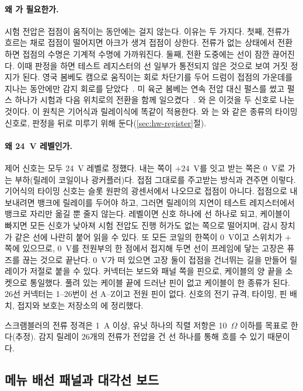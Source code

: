 \paragraph{왜 가 필요한가.} 시험 전압은 접점이 움직이는 동안에는 걸지 않는다. 이유는 두 가지다.
첫째, 전류가 흐르는 채로 접점이 떨어지면 아크가 생겨 접점이 상한다. 전류가 없는 상태에서 전환하면 접점의
수명은 기계적 수명에 가까워진다. 둘째, 전환 도중에는 선이 잠깐 끊어진다. 이때 판정을 하면 테스트 레지스터의
선 일부가 통전되지 않은 것으로 보여 거짓 정지가 된다. 영국 봄베도 캠으로 움직이는 회로 차단기를 두어 드럼이
접점의 가운데를 지나는 동안에만 감지 회로를 닫았다~\cite{us6812report1944}. 미 육군 봄베는 연속 전압 대신
펄스를 썼고 펄스 하나가 시험과 다음 위치로의 전환을 함께 일으켰다~\cite{dturing2021army}. 와
은 이것을 두 신호로 나눈 것이다. 이 원칙은 기어식과 릴레이식에 똑같이 적용한다.
와 는 와 같은 종류의 타이밍 신호로, 판정을  뒤로 미루기 위해
둔다(\ref{sec:hw-register}절).

\paragraph{왜 24~V 레벨인가.} 제어 신호는 모두 24~V 레벨로 정했다. 내는 쪽이 $+24$~V를 잇고 받는 쪽은 0~V로 가는
부하(릴레이 코일이나 광커플러)다. 접점 그대로를 주고받는 방식과 견주면 이렇다. 기어식의 타이밍 신호는 슬롯
원판의 광센서에서 나오므로 접점이 아니다. 접점으로 내보내려면 뱅크에 릴레이를 두어야 하고, 그러면 릴레이의
지연이 테스트 레지스터에서 뱅크로 자리만 옮길 뿐 줄지 않는다. 레벨이면 신호 하나에 선 하나로 되고, 케이블이
빠지면 모든 신호가 낮아져 시험 전압도 진행 허가도 없는 쪽으로 떨어지며, 감시 장치가 같은 선에 나란히 붙어 읽을
수 있다. 또 모든 코일의 한쪽이 0~V이고 스위치가 $+$ 쪽에 있으므로, 0~V를 전원부의 한 점에서 접지해 두면 선이
프레임에 닿는 고장은 퓨즈를 끊는 것으로 끝난다. 0~V가 떠 있으면 고장 둘이 접점을 건너뛰는 길을 만들어 릴레이가
저절로 붙을 수 있다. 커넥터는 보드와 패널 쪽을 핀으로, 케이블의 양 끝을 소켓으로 통일했다. 풀려 있는 케이블
끝에 드러난 핀이 없고 케이블이 한 종류가 된다. 26선 커넥터는 1--26번이 선 A--Z이고 전원 핀이 없다. 신호의 전기
규격, 타이밍, 핀 배치, 접지와 보호는 저장소의 에 정리했다.

스크램블러의 전류 정격은 1~A 이상, 유닛 하나의 직렬 저항은 10~$\Omega$ 이하를 목표로 한다(추정).
감지 릴레이 26개의 전류가 전압을 건 선 하나를 통해 흐를 수 있기 때문이다.

\subsection{메뉴 배선 패널과 대각선 보드}

